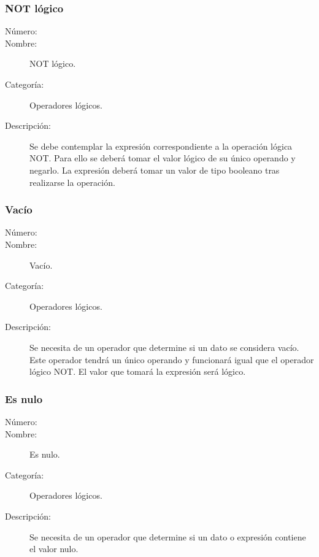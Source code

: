 \subsubsection{NOT lógico}
	\begin{description}
		\item [Número:] \cn
		\item [Nombre:] NOT lógico.
		\item [Categoría:] Operadores lógicos.
		\item [Descripción:] Se debe contemplar la expresión correspondiente a la operación lógica NOT. Para ello se deberá tomar
		el valor lógico de su único operando y negarlo. La expresión deberá tomar un valor de tipo booleano tras realizarse la operación.
	\end {description}

\subsubsection{Vacío}
	\begin{description}
		\item [Número:] \cn
		\item [Nombre:] Vacío.
		\item [Categoría:] Operadores lógicos.
		\item [Descripción:] Se necesita de un operador que determine si un dato se considera vacío. Este operador tendrá un
		único operando y funcionará igual que el operador lógico NOT. El valor que tomará la expresión será lógico.
	\end {description}

\subsubsection{Es nulo}
	\begin{description}
		\item [Número:] \cn
		\item [Nombre:] Es nulo.
		\item [Categoría:] Operadores lógicos.
		\item [Descripción:] Se necesita de un operador que determine si un dato o expresión contiene el valor nulo.
	\end {description}

